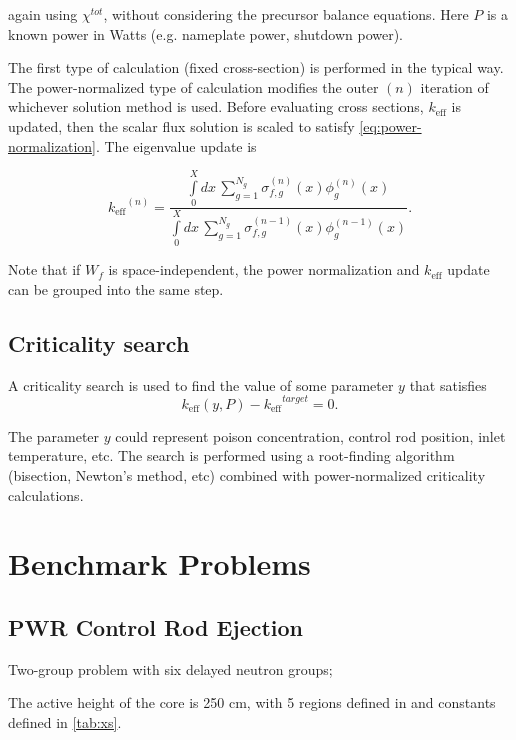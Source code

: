 \documentclass{proposal}
\newcommand{\keff}{\ensuremath{k_{\text{eff}}}}
\begin{document}
again using $\chi^{tot}$, without considering the precursor balance equations. Here $P$ is a known power in Watts (e.g. nameplate power, shutdown power).

The first type of calculation (fixed cross-section) is performed in the typical way. The power-normalized type of calculation modifies the outer $(n)$ iteration of whichever solution method is used. Before evaluating cross sections, $\keff$ is updated, then the scalar flux solution is scaled to satisfy \cref{eq:power-normalization}. The eigenvalue update is

\begin{equation}
    \keff^{(n)} = \frac{\int\limits_0^{X}dx\, \sum_{g=1}^{N_g} \sigma_{f, g}^{(n)}(x)\phi_{g}^{(n)}(x)}{\int\limits_0^{X}dx\, \sum_{g=1}^{N_g} \sigma_{f, g}^{(n-1)}(x)\phi_{g}^{(n-1)}(x)}.
\end{equation}

Note that if $W_f$ is space-independent, the power normalization and $\keff$ update can be grouped into the same step.

\subsection{Criticality search}

A criticality search is used to find the value of some parameter $y$ that satisfies
\begin{equation}
    \keff(y, P) - \keff^{target}= 0.
\end{equation}

The parameter $y$ could represent poison concentration, control rod position, inlet temperature, etc. The search is performed using a root-finding algorithm (bisection, Newton's method, etc) combined with power-normalized criticality calculations.



\section{Benchmark Problems}

\subsection{PWR Control Rod Ejection~\cite{larsen1981danish}}

Two-group problem with six delayed neutron groups; 

The active height of the core is 250 cm, with 5 regions defined in  and constants defined in \cref{tab:xs}.
\end{document}
